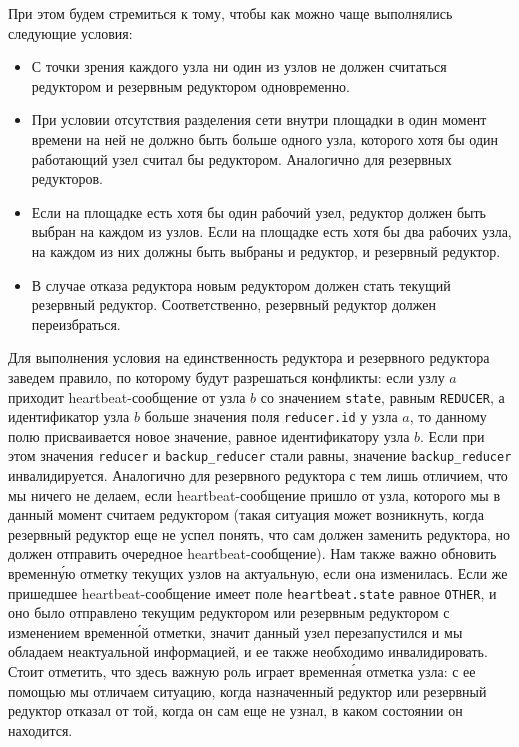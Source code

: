 \documentclass{article}
\theoremstyle{plain}
\theoremstyle{plain}
\theoremstyle{plain}
\theoremstyle{plain}
\theoremstyle{definition}
\theoremstyle{remark}
\theoremstyle{plain}
\begin{document}
При этом будем стремиться к тому, чтобы как можно чаще выполнялись следующие условия:

\begin{itemize}
    \item С точки зрения каждого узла ни один из узлов не должен считаться редуктором и резервным редуктором одновременно.

    \item При условии отсутствия разделения сети \cite[с.~2]{CAP_Theorem} внутри площадки в один момент времени на ней не должно быть больше одного узла, которого хотя бы один работающий узел считал бы редуктором. Аналогично для резервных редукторов.
    
    \item Если на площадке есть хотя бы один рабочий узел, редуктор должен быть выбран на каждом из узлов. Если на площадке есть хотя бы два рабочих узла, на каждом из них должны быть выбраны и редуктор, и резервный редуктор.
    
    \item В случае отказа редуктора новым редуктором должен стать текущий резервный редуктор. Соответственно, резервный редуктор должен переизбраться.
\end{itemize}

Для выполнения условия на единственность редуктора и резервного редуктора заведем правило, по которому будут разрешаться конфликты: если узлу $a$ приходит heartbeat-со\-об\-ще\-ние от узла $b$ со значением \texttt{state}, равным \texttt{REDUCER}, а идентификатор узла $b$ больше значения поля \texttt{reducer.id} у узла $a$, то данному полю присваивается новое значение, равное идентификатору узла $b$. Если при этом значения \texttt{reducer} и \texttt{backup\_reducer} стали равны, значение \texttt{backup\_reducer} инвалидируется. Аналогично для резервного редуктора с тем лишь отличием, что мы ничего не делаем, если heartbeat-со\-об\-ще\-ние пришло от узла, которого мы в данный момент считаем редуктором (такая ситуация может возникнуть, когда резервный редуктор еще не успел понять, что сам должен заменить редуктора, но должен отправить очередное heartbeat-со\-об\-ще\-ние). Нам также важно обновить временн\'{у}ю отметку текущих узлов на актуальную, если она изменилась. Если же пришедшее heartbeat-со\-об\-ще\-ние имеет поле \texttt{heartbeat.state} равное \texttt{OTHER}, и оно было отправлено текущим редуктором или резервным редуктором с изменением временн\'{о}й отметки, значит данный узел перезапустился и мы обладаем неактуальной информацией, и ее также необходимо инвалидировать. Стоит отметить, что здесь важную роль играет временн\'{а}я отметка узла: с ее помощью мы отличаем ситуацию, когда назначенный редуктор или резервный редуктор отказал от той, когда он сам еще не узнал, в каком состоянии он находится.
\end{document}
